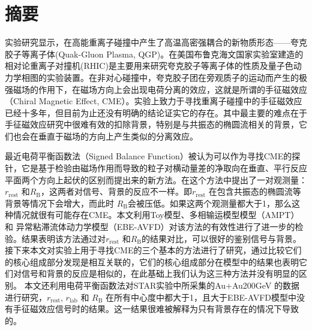 

\setcounter{section}{0}



\chapter*{摘要}

实验研究显示，在高能重离子碰撞中产生了高温高密强耦合的新物质形态——夸克胶子等离子体(Quak-Gluon Plasma, QGP)。在美国布鲁克海文国家实验室建造的相对论重离子对撞机(RHIC)是主要用来研究夸克胶子等离子体的性质及量子色动力学相图的实验装置。在非对心碰撞中，夸克胶子团在旁观质子的运动而产生的极强磁场的作用下，在磁场方向上会出现电荷分离的效应，这就是所谓的手征磁效应（Chiral Magnetic Effect, CME）。实验上致力于寻找重离子碰撞中的手征磁效应已经十多年，但目前为止还没有明确的结论证实它的存在。其中最主要的难点在于手征磁效应研究中很难有效的扣除背景，特别是与共振态的椭圆流相关的背景，它们也会在垂直于磁场的方向上产生类似的分离效应。

最近电荷平衡函数法（Signed Balance Function）被认为可以作为寻找CME的探针，它是基于检验由磁场作用而导致的粒子对横动量差的净取向在垂直、平行反应平面两个方向上起伏的区别而提出来的新方法。在这个方法中提出了一对观测量：$r_{\mathrm{rest}}$ 和$R_{\mathrm{B}}$，这两者对信号、背景的反应不一样。即$r_{\mathrm{rest}}$ 在包含共振态的椭圆流等背景等情况下会增大，而此时
$R_{\mathrm{B}}$会被压低。如果这两个观测量都大于1，那么这种情况就很有可能存在CME。本文利用Toy模型、多相输运模型模型（AMPT）和
异常粘滞流体动力学模型（EBE-AVFD）对该方法的有效性进行了进一步的检验。结果表明该方法通过对$r_{\mathrm{rest}}$ 和$R_{\mathrm{B}}$的结果对比，可以很好的鉴别信号与背景。接下来本文对实验上用于寻找CME的三个基本的方法进行了研究，通过比较它们的核心组成部分发现是相互关联的，它们的核心组成部分在模型中的结果也表明它们对信号和背景的反应是相似的，在此基础上我们认为这三种方法并没有明显的区别。
本文还利用电荷平衡函数法对STAR实验中所采集的Au+Au200GeV 的数据进行研究，$r_{\mathrm{rest}}$,  $r_{\mathrm{lab}}$ 和 $R_{\mathrm{B}}$ 在所有中心度中都大于1，且大于EBE-AVFD模型中没有手征磁效应信号时的结果。这一结果很难被解释为只有背景存在的情况下导致的。


